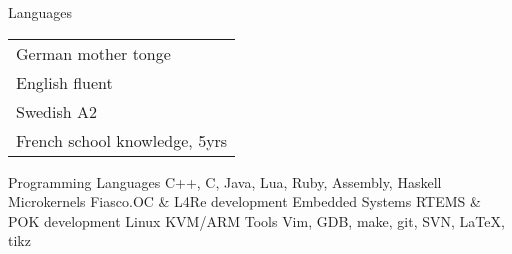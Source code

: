 \clearpage
{}
  \begin{cvskills}
  	\cvskill
		{Languages}
		{
		  \def\arraystretch{1}
		  \begin{tabular}[]{l}
		  German \hspace{4.9mm} mother tonge \\
		  English \hspace{6mm} fluent \\
		  Swedish \hspace{4.5mm} A2 \\
		  French \hspace{6.6mm} school knowledge, 5yrs
		  \end{tabular}
		  \def\arraystretch{1.2}
		}
	\cvskill
		{Programming Languages}
		{C++, C, Java, Lua, Ruby, Assembly, Haskell}
	\cvskill
		{Microkernels}
		{Fiasco.OC \& L4Re development}
	\cvskill
		{Embedded Systems}
		{RTEMS \& POK development}
	\cvskill
		{Linux}
		{KVM/ARM}
	\cvskill
		{Tools}
		{Vim, GDB, make, git, SVN, LaTeX, tikz}
  \end{cvskills}

